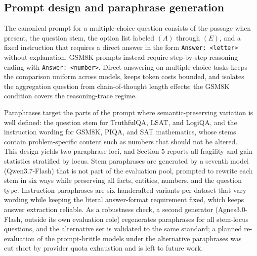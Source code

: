 \documentclass[preprint,12pt]{elsarticle}
\begin{document}
\subsection{Prompt design and paraphrase generation}

The canonical prompt for a multiple-choice question consists of the passage when present, the question stem, the option list labeled $(A)$ through $(E)$, and a fixed instruction that requires a direct answer in the form \texttt{Answer: <letter>} without explanation. GSM8K prompts instead require step-by-step reasoning ending with \texttt{Answer: <number>}. Direct answering on multiple-choice tasks keeps the comparison uniform across models, keeps token costs bounded, and isolates the aggregation question from chain-of-thought length effects; the GSM8K condition covers the reasoning-trace regime.

Paraphrases target the parts of the prompt where semantic-preserving variation is well defined: the question stem for TruthfulQA, LSAT, and LogiQA, and the instruction wording for GSM8K, PIQA, and SAT mathematics, whose stems contain problem-specific content such as numbers that should not be altered. This design yields two paraphrase loci, and Section 5 reports all fragility and gain statistics stratified by locus. Stem paraphrases are generated by a seventh model (Qwen3.7-Flash) that is not part of the evaluation pool, prompted to rewrite each stem in six ways while preserving all facts, entities, numbers, and the question type. Instruction paraphrases are six handcrafted variants per dataset that vary wording while keeping the literal answer-format requirement fixed, which keeps answer extraction reliable. As a robustness check, a second generator (Agnes3.0-Flash, outside its own evaluation role) regenerates paraphrases for all stem-locus questions, and the alternative set is validated to the same standard; a planned re-evaluation of the prompt-brittle models under the alternative paraphrases was cut short by provider quota exhaustion and is left to future work.
\end{document}
